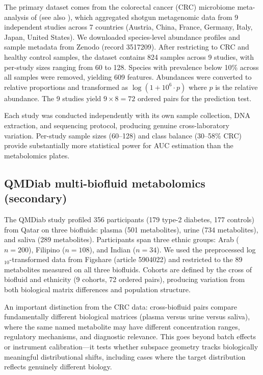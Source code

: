 \documentclass[11pt]{article}
\begin{document}
The primary dataset comes from the colorectal cancer (CRC) microbiome meta-analysis of \citet{wirbel2019meta} (see also \citealp{thomas2019metaanalysis}), which aggregated shotgun metagenomic data from 9 independent studies across 7 countries (Austria, China, France, Germany, Italy, Japan, United States). We downloaded species-level abundance profiles and sample metadata from Zenodo (record 3517209). After restricting to CRC and healthy control samples, the dataset contains 824 samples across 9 studies, with per-study sizes ranging from 60 to 128. Species with prevalence below 10\% across all samples were removed, yielding 609 features. Abundances were converted to relative proportions and transformed as $\log(1 + 10^6 \cdot p)$ where $p$ is the relative abundance. The 9 studies yield $9 \times 8 = 72$ ordered pairs for the prediction test.

Each study was conducted independently with its own sample collection, DNA extraction, and sequencing protocol, producing genuine cross-laboratory variation. Per-study sample sizes (60--128) and class balance (30--58\% CRC) provide substantially more statistical power for AUC estimation than the metabolomics plates.

\subsection{QMDiab multi-biofluid metabolomics (secondary)}
\label{sec:qmdiab_data}

The QMDiab study \citep{yousri2015metabolic} profiled 356 participants (179 type-2 diabetes, 177 controls) from Qatar on three biofluids: plasma (501 metabolites), urine (734 metabolites), and saliva (289 metabolites). Participants span three ethnic groups: Arab ($n = 200$), Filipino ($n = 108$), and Indian ($n = 34$). We used the preprocessed log$_{10}$-transformed data from Figshare (article 5904022) and restricted to the 89 metabolites measured on all three biofluids. Cohorts are defined by the cross of biofluid and ethnicity (9 cohorts, 72 ordered pairs), producing variation from both biological matrix differences and population structure.

An important distinction from the CRC data: cross-biofluid pairs compare fundamentally different biological matrices (plasma versus urine versus saliva), where the same named metabolite may have different concentration ranges, regulatory mechanisms, and diagnostic relevance. This goes beyond batch effects or instrument calibration---it tests whether subspace geometry tracks biologically meaningful distributional shifts, including cases where the target distribution reflects genuinely different biology.
\end{document}
